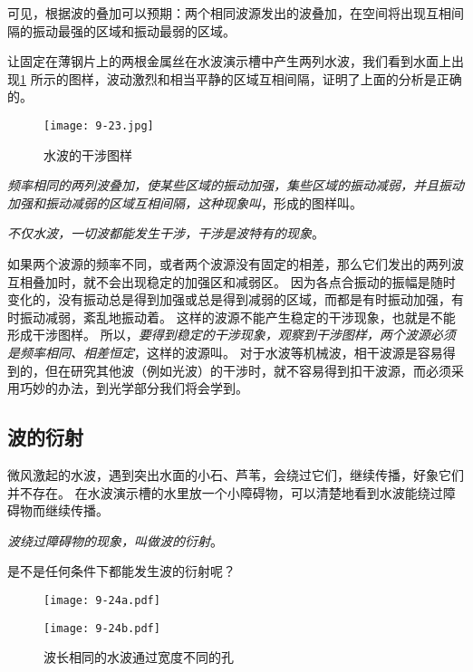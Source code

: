 可见，根据波的叠加可以预期：两个相同波源发出的波叠加，在空间将出现互相间隔的振动最强的区域和振动最弱的区域。

让固定在薄钢片上的两根金属丝在水波演示槽中产生两列水波，我们看到水面上出现\cref{fig:9-23} 所示的图样，波动激烈和相当平静的区域互相间隔，证明了上面的分析是正确的。
\begin{figure}
  \texttt{[image: 9-23.jpg]}
  \caption{水波的干涉图样}\label{fig:9-23}
\end{figure}

\emph{频率相同的两列波叠加，使某些区域的振动加强，集些区域的振动减弱，并且振动加强和振动减弱的区域互相间隔，这种现象叫}，形成的图样叫。

\emph{不仅水波，一切波都能发生干涉，干涉是波特有的现象}。

如果两个波源的频率不同，或者两个波源没有固定的相差，那么它们发出的两列波互相叠加时，就不会出现稳定的加强区和减弱区。
因为各点合振动的振幅是随时变化的，没有振动总是得到加强或总是得到减弱的区域，而都是有时振动加强，有时振动减弱，紊乱地振动着。
这样的波源不能产生稳定的干涉现象，也就是不能形成干涉图样。
所以，\emph{要得到稳定的干涉现象，观察到干涉图样，两个波源必须是频率相同、相差恒定}，这样的波源叫。
对于水波等机械波，相干波源是容易得到的，但在研究其他波（例如光波）的干涉时，就不容易得到扣干波源，而必须采用巧妙的办法，到光学部分我们将会学到。

\subsection{波的衍射}
微风激起的水波，遇到突出水面的小石、芦苇，会绕过它们，继续传播，好象它们并不存在。
在水波演示槽的水里放一个小障碍物，可以清楚地看到水波能绕过障碍物而继续传播。

\emph{波绕过障碍物的现象，叫做波的衍射}。

是不是任何条件下都能发生波的衍射呢？
\begin{figure}
  \begin{minipage}[b]{0.48\linewidth}\centering
    \texttt{[image: 9-24a.pdf]}
    \subcaption{}\label{fig:9-24a}
  \end{minipage}
  \begin{minipage}[b]{0.48\linewidth}\centering
    \texttt{[image: 9-24b.pdf]}
    \subcaption{}\label{fig:9-24b}
  \end{minipage}
    \caption{波长相同的水波通过宽度不同的孔}\label{fig:9-24}
\end{figure}

